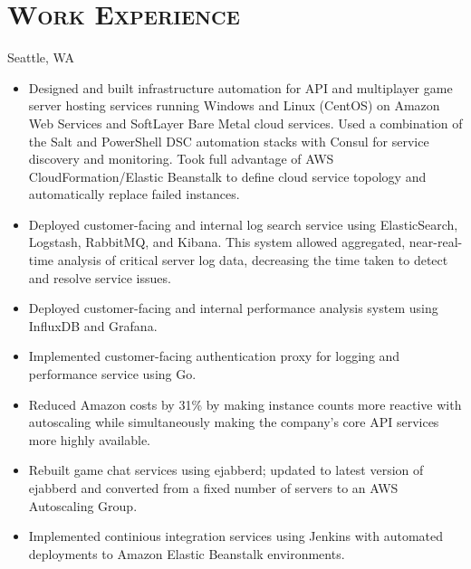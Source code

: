 \documentclass[11pt,letter,roman]{moderncv}
\begin{document}
\section{\textsc{Work Experience}}
{Seattle, WA}{}{%
  \begin{itemize}
    \item Designed and built infrastructure automation for API and multiplayer
      game server hosting services running Windows and Linux (CentOS) on Amazon
      Web Services and SoftLayer Bare Metal cloud services. Used a combination
      of the Salt and PowerShell DSC automation stacks with Consul for service
      discovery and monitoring. Took full advantage of AWS
      CloudFormation/Elastic Beanstalk to define cloud service topology and
      automatically replace failed instances.
    \item Deployed customer-facing and internal log search service using
      ElasticSearch, Logstash, RabbitMQ, and Kibana. This system allowed
      aggregated, near-real-time analysis of critical server log data,
      decreasing the time taken to detect and resolve service issues.
    \item Deployed customer-facing and internal performance analysis system
      using InfluxDB and Grafana.
    \item Implemented customer-facing authentication proxy for logging and
      performance service using Go.
    \item Reduced Amazon costs by 31\% by making instance counts more reactive
      with autoscaling while simultaneously  making the company's core API
      services more highly available.
    \item Rebuilt game chat services using ejabberd; updated to latest version
      of ejabberd and converted from a fixed number of servers to an AWS
      Autoscaling Group.
    \item Implemented continious integration services using Jenkins with
      automated deployments to Amazon Elastic Beanstalk environments.
  \end{itemize}
}
\end{document}
